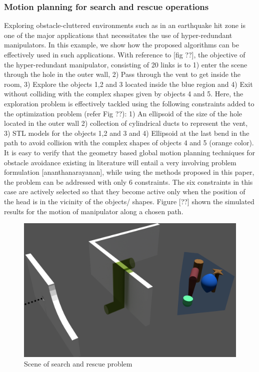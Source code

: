 \documentclass[12pt,a4]{article}
\begin{document}
\subsubsection{Motion planning for search and rescue operations}
Exploring obstacle-cluttered environments such as in an earthquake hit zone is one of the major applications that necessitates the use of hyper-redundant manipulators. In this example, we show how the proposed algorithms can be effectively used in such applications. With reference to [fig ??], the objective of the hyper-redundant manipulator, consisting of 20 links is to 1) enter the scene through the hole in the outer wall, 2) Pass through the vent to get inside the room, 3) Explore the objects 1,2 and 3 located inside the blue region and 4) Exit without colliding with the complex shapes given by objects 4 and 5. Here, the exploration problem is effectively tackled using the following constraints added to the optimization problem (refer Fig ??): 1) An ellipsoid of the size of the hole located in the outer wall 2) collection of cylindrical ducts to represent the vent, 3) STL models for the objects 1,2 and 3 and 4) Ellipsoid at the last bend in the path to avoid collision with the complex shapes of objects 4 and 5 (orange color). It is easy to verify that the geometry based global motion planning techniques for obstacle avoidance existing in literature will entail a very involving problem formulation [ananthanarayanan], while using the methods proposed in this paper, the problem can be addressed with only 6 constraints. The six constraints in this case are actively selected so that they become active only when the position of the head is in the vicinity of the objects/ shapes. Figure [??] shown the simulated results for the motion of manipulator along a chosen path. 

\begin{figure}[h!]
\centering
\includegraphics[scale=0.2]{figures/figscene.png}
\caption{ Scene of search and rescue problem \label{fig:scene}}
\end{figure}
\end{document}
